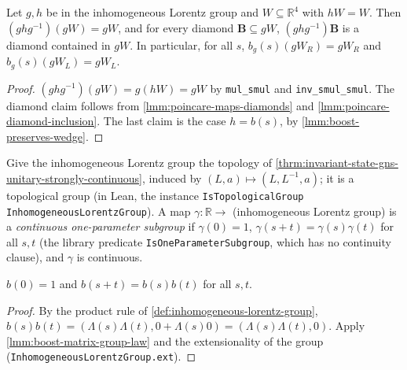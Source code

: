 \begin{lemma}
    \label{lmm:conjugate-stabilises-wedge}
    \leanok
    Let $g, h$ be in the inhomogeneous Lorentz group and $W \subseteq \mathbb{R}^4$ with $hW = W$. Then $(ghg^{-1})(gW) = gW$, and for every diamond $\mathbf{B} \subseteq gW$, $(ghg^{-1})\mathbf{B}$ is a diamond contained in $gW$. In particular, for all $s$, $b_g(s)(gW_R) = gW_R$ and $b_g(s)(gW_L) = gW_L$.
\end{lemma}
\begin{proof}
    \leanok
    $(ghg^{-1})(gW) = g(hW) = gW$ by \texttt{mul\_smul} and \texttt{inv\_smul\_smul}. The diamond claim follows from \ref{lmm:poincare-maps-diamonds} and \ref{lmm:poincare-diamond-inclusion}. The last claim is the case $h = b(s)$, by \ref{lmm:boost-preserves-wedge}.
\end{proof}

\begin{definition}
    \label{def:continuous-one-parameter-subgroup}
    \leanok
    Give the inhomogeneous Lorentz group the topology of \ref{thrm:invariant-state-gns-unitary-strongly-continuous}, induced by $(L, a) \mapsto (L, L^{-1}, a)$; it is a topological group (in Lean, the instance \texttt{IsTopologicalGroup InhomogeneousLorentzGroup}). A map $\gamma : \mathbb{R} \to$ (inhomogeneous Lorentz group) is a \emph{continuous one-parameter subgroup} if $\gamma(0) = 1$, $\gamma(s + t) = \gamma(s)\gamma(t)$ for all $s, t$ (the library predicate \texttt{IsOneParameterSubgroup}, which has no continuity clause), and $\gamma$ is continuous.
\end{definition}

\begin{lemma}
    \label{lmm:boost-group-law}
    \leanok
    $b(0) = 1$ and $b(s + t) = b(s)b(t)$ for all $s, t$.
\end{lemma}
\begin{proof}
    \leanok
    By the product rule of \ref{def:inhomogeneous-lorentz-group}, $b(s)b(t) = (\Lambda(s)\Lambda(t), 0 + \Lambda(s)0) = (\Lambda(s)\Lambda(t), 0)$. Apply \ref{lmm:boost-matrix-group-law} and the extensionality of the group (\texttt{InhomogeneousLorentzGroup.ext}).
\end{proof}

